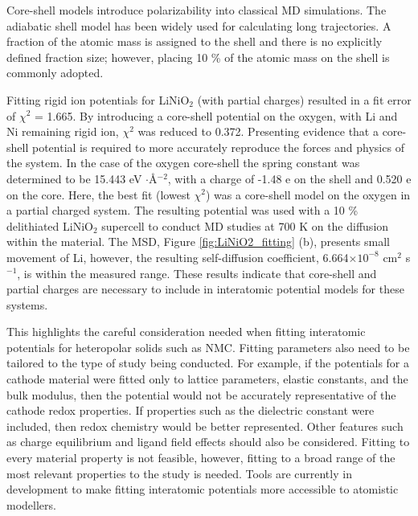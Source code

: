 \documentclass[aps,prb,twocolumn,superscriptaddress,reprint]{revtex4-1}
\begin{document}
Core-shell models introduce polarizability into classical MD simulations. The adiabatic shell model \cite{Mitchell_1993} has been widely used for calculating long trajectories. 
A fraction of the atomic mass is assigned to the shell and there is no explicitly defined fraction size; however, placing 10 \% of the atomic mass on the shell is commonly adopted. \cite{PLIMPTON19951,todorov2006dl_poly_3}

Fitting rigid ion potentials for LiNiO$_2$ (with partial charges) resulted in a fit error of $\chi^2$ = 1.665.
By introducing a core-shell potential on the oxygen, with Li and Ni remaining rigid ion, $\chi^2$ was reduced to 0.372. 
Presenting evidence that a core-shell potential is required to more accurately reproduce the forces and physics of the system.
In the case of the oxygen core-shell the spring constant was determined to be 15.443 eV $\cdot$\AA$^{-2}$, with a charge of -1.48 e on the shell and 0.520 e on the core.
Here, the best fit (lowest $\chi^2$) was a core-shell model on the oxygen in a partial charged system. The resulting potential was used with a 10 \% delithiated LiNiO$_2$ supercell to conduct MD studies at 700 K on the diffusion within the material.
The MSD, Figure \ref{fig:LiNiO2_fitting} (b), presents small movement of Li, however, the resulting self-diffusion coefficient, 6.664$\times 10^{-8}$  cm$^{2}$ s$^{-1}$, is within the measured range. \cite{Nakamura2000,bruce1992vacancy}
These results indicate that core-shell and partial charges are necessary to include in interatomic potential models for these systems. 

This highlights the careful consideration needed when fitting interatomic potentials for heteropolar solids such as NMC.
Fitting parameters also need to be tailored to the type of study being conducted.
For example, if the potentials for a cathode material were fitted only to lattice parameters, elastic constants, and the bulk modulus, then the potential would not be accurately representative of the cathode redox properties. 
If properties such as the dielectric constant were included, then redox chemistry would be better represented. 
Other features such as charge equilibrium and ligand field effects should also be considered. 
Fitting to every material property is not feasible, however, fitting to a broad range of the most relevant properties to the study is needed. 
Tools are currently in development to make fitting interatomic potentials more accessible to atomistic modellers. \cite{gale_empirical_1996, Stukowski_2017, wen_kim-compliant_2017, Morgan2020PopOff}
\end{document}
